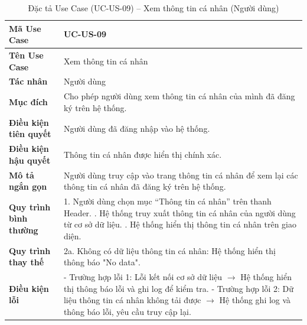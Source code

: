 \renewcommand{\arraystretch}{1.3}
\setlength{\tabcolsep}{4pt}
\begin{longtable}{|p{}|p{}|}
\caption{Đặc tả Use Case (UC-US-09) -- Xem thông tin cá nhân (Người dùng) }\label{tab:uc_view_profile_user}\\
\hline
\textbf{Mã Use Case} & UC-US-09 \\ \hline
\textbf{Tên Use Case} & Xem thông tin cá nhân \\ \hline
\textbf{Tác nhân} & Người dùng \\ \hline
\textbf{Mục đích} & Cho phép người dùng xem thông tin cá nhân của mình đã đăng ký trên hệ thống. \\ \hline
\textbf{Điều kiện tiên quyết} & Người dùng đã đăng nhập vào hệ thống. \\ \hline
\textbf{Điều kiện hậu quyết} & Thông tin cá nhân được hiển thị chính xác. \\ \hline
\textbf{Mô tả ngắn gọn} & Người dùng truy cập vào trang thông tin cá nhân để xem lại các thông tin cá nhân đã đăng ký trên hệ thống. \\ \hline
\textbf{Quy trình bình thường} &
1. Người dùng chọn mục “Thông tin cá nhân” trên thanh Header. \newline
2. Hệ thống truy xuất thông tin cá nhân của người dùng từ cơ sở dữ liệu. \newline
3. Hệ thống hiển thị thông tin cá nhân trên giao diện. \\ \hline
\textbf{Quy trình thay thế} &
2a. Không có dữ liệu thông tin cá nhân: Hệ thống hiển thị thông báo "No data". \\ \hline
\textbf{Điều kiện lỗi} &
- Trường hợp lỗi 1: Lỗi kết nối cơ sở dữ liệu $\rightarrow$ Hệ thống hiển thị thông báo lỗi và ghi log để kiểm tra. \newline
- Trường hợp lỗi 2: Dữ liệu thông tin cá nhân không tải được $\rightarrow$ Hệ thống ghi log và thông báo lỗi, yêu cầu truy cập lại. \\ \hline
\end{longtable}

